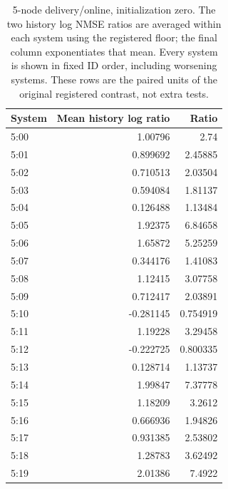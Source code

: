 \begin{table}[ht]
\centering\scriptsize
\begin{tabular}{lrr}
\toprule
System & Mean history log ratio & Ratio\\
\midrule
5:00 & 1.00796 & 2.74\\
5:01 & 0.899692 & 2.45885\\
5:02 & 0.710513 & 2.03504\\
5:03 & 0.594084 & 1.81137\\
5:04 & 0.126488 & 1.13484\\
5:05 & 1.92375 & 6.84658\\
5:06 & 1.65872 & 5.25259\\
5:07 & 0.344176 & 1.41083\\
5:08 & 1.12415 & 3.07758\\
5:09 & 0.712417 & 2.03891\\
5:10 & -0.281145 & 0.754919\\
5:11 & 1.19228 & 3.29458\\
5:12 & -0.222725 & 0.800335\\
5:13 & 0.128714 & 1.13737\\
5:14 & 1.99847 & 7.37778\\
5:15 & 1.18209 & 3.2612\\
5:16 & 0.666936 & 1.94826\\
5:17 & 0.931385 & 2.53802\\
5:18 & 1.28783 & 3.62492\\
5:19 & 2.01386 & 7.4922\\
\bottomrule
\end{tabular}
\caption{5-node delivery/online, initialization zero. The two history log NMSE ratios are averaged within each system using the registered floor; the final column exponentiates that mean. Every system is shown in fixed ID order, including worsening systems. These rows are the paired units of the original registered contrast, not extra tests.}
\end{table}
